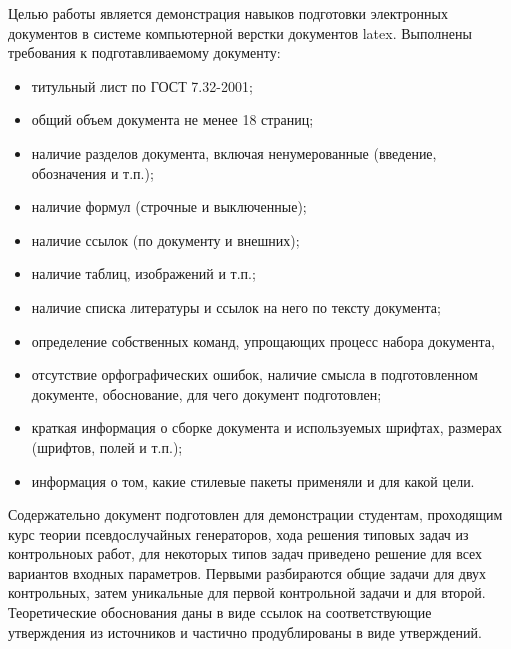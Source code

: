 \Introduction

Целью работы является демонстрация навыков подготовки электронных документов в системе компьютерной верстки документов latex. Выполнены требования к подготавливаемому документу:

\begin{itemize}
\item титульный лист по ГОСТ 7.32-2001;
\item общий объем документа не менее 18 страниц;
\item наличие разделов документа, включая ненумерованные (введение, обозначения и т.п.);
\item наличие формул (строчные и выключенные);
\item наличие ссылок (по документу и внешних);
\item наличие таблиц, изображений и т.п.;
\item наличие списка литературы и ссылок на него по тексту документа;
\item определение собственных команд, упрощающих процесс набора документа,
\item отсутствие орфографических ошибок, наличие смысла в подготовленном документе,
обоснование, для чего документ подготовлен;
\item краткая информация о сборке документа и используемых шрифтах, размерах (шрифтов, полей и т.п.);
\item информация о том, какие стилевые пакеты применяли и для какой цели.
\end{itemize}

Содержательно документ подготовлен для демонстрации студентам, проходящим курс теории псевдослучайных генераторов, хода решения типовых задач из контрольноых работ, для некоторых типов задач приведено решение для всех вариантов входных параметров. Первыми разбираются общие задачи для двух контрольных, затем уникальные для первой контрольной задачи и для второй. Теоретические обоснования даны в виде ссылок на соответствующие утверждения из источников и частично продублированы в виде утверждений. 
